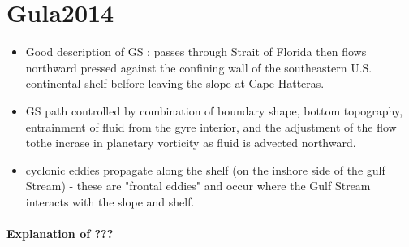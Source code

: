 \documentclass[..\Papers.tex]{subfiles}
\begin{document}
\section{Gula2014}
\citep{Gula2014}


\begin{itemize}
    \item Good description of GS : passes through Strait of Florida then flows northward pressed against the confining wall of the southeastern U.S. continental shelf belfore leaving the slope at Cape Hatteras.
    \item GS path controlled by combination of boundary shape, bottom topography, entrainment of fluid from the gyre interior, and the adjustment of the flow tothe incrase in planetary vorticity as fluid is advected northward.
    \item cyclonic eddies propagate along the shelf (on the inshore side of the gulf Stream) - these are "frontal eddies" and occur where the Gulf Stream interacts with the slope and shelf.
\end{itemize}

\paragraph{Explanation of ???}
\end{document}
